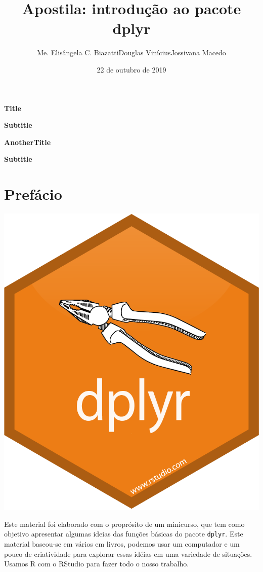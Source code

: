 \documentclass[]{book}
\title{Apostila: introdução ao pacote dplyr}
\author{Me. Elisângela C. BiazattiDouglas ViníciusJossivana Macedo}
\date{22 de outubro de 2019}
\begin{document}
\maketitle

{
\pagestyle{empty}
\begin{titlepage}
   \begin{center}

       \Huge

       \textbf{Title}

       \vspace{0.5cm}

       \LARGE
       \textbf{Subtitle}

   \end{center}
\end{titlepage}

\begin{titlepage}
   \begin{center}

       \Huge

       \textbf{AnotherTitle}

       \vspace{0.5cm}

       \LARGE
       \textbf{Subtitle}

   \end{center}
\end{titlepage}
}

{
\setcounter{tocdepth}{1}
\tableofcontents
}
\hypertarget{prefuxe1cio}{%
\chapter{Prefácio}\label{prefuxe1cio}}

\begin{center}\includegraphics[width=0.3\linewidth]{imagens/dplyr} \end{center}

Este material foi elaborado com o proprósito de um minicurso, que tem como objetivo apresentar algumas ideias das funções básicas do pacote \texttt{dplyr}. Este material baseou-se em vários em livros, podemos usar um computador e um pouco de criatividade para explorar essas idéias em uma variedade de situações. Usamos R com o RStudio para fazer todo o nosso trabalho.
\end{document}
